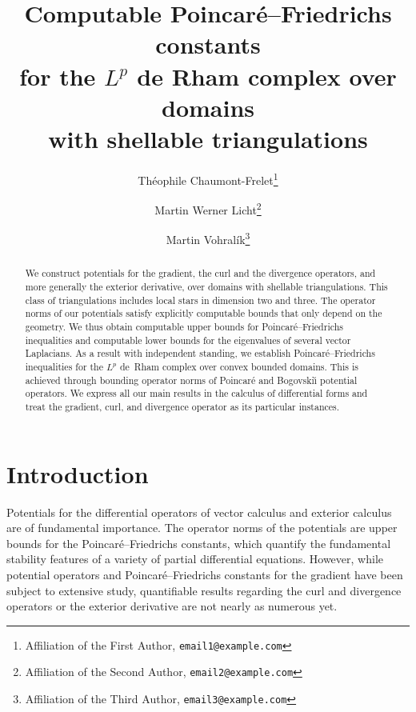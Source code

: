 \documentclass[12pt,a4paper]{article}
\title{Computable Poincar\'e--Friedrichs constants\\ for the $L^{p}$ de Rham complex over domains\\ with shellable triangulations}
\author{
    Th\'eophile Chaumont-Frelet\thanks{Affiliation of the First Author, \texttt{email1@example.com}} \and
    Martin Werner Licht\thanks{Affiliation of the Second Author, \texttt{email2@example.com}} \and
    Martin Vohral\'ik\thanks{Affiliation of the Third Author, \texttt{email3@example.com}}
}
\newcommand{\todo}[1]{\textcolor{red}{TODO: #1}}
\begin{document}
\maketitle

\begin{abstract}
    We construct potentials for the gradient, the curl and the divergence operators, and more generally the exterior derivative, over domains with shellable triangulations. This class of triangulations includes local stars in dimension two and three. 
    The operator norms of our potentials satisfy explicitly computable bounds that only depend on the geometry. 
    We thus obtain computable upper bounds for Poincar\'e--Friedrichs inequalities and computable lower bounds for the eigenvalues of several vector Laplacians. 
    As a result with independent standing, we establish Poincar\'e--Friedrichs inequalities for the $L^{p}$ de~Rham complex over convex bounded domains. 
    This is achieved through bounding operator norms of Poincar\'e and Bogovski\u{\i} potential operators.
    We express all our main results in the calculus of differential forms and treat the gradient, curl, and divergence operator as its particular instances. 
\end{abstract}


\section{Introduction}\label{section:intro}

Potentials for the differential operators of vector calculus and exterior calculus are of fundamental importance.
The operator norms of the potentials are upper bounds for the Poincar\'e--Friedrichs constants, 
which quantify the fundamental stability features of a variety of partial differential equations.
However, while potential operators and Poincar\'e--Friedrichs constants for the gradient have been subject to extensive study, quantifiable results regarding the curl and divergence operators or the exterior derivative are not nearly as numerous yet. 
\end{document}

